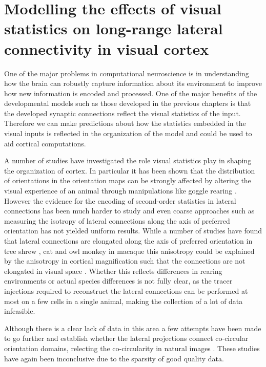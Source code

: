 \chapter{Modelling the effects of visual statistics on long-range lateral connectivity in visual cortex}

One of the major problems in computational neuroscience is in
understanding how the brain can robustly capture information about its
environment to improve how new information is encoded and
processed. One of the major benefits of the developmental models such
as those developed in the previous chapters is that the developed
synaptic connections reflect the visual statistics of the
input. Therefore we can make predictions about how the statistics
embedded in the visual inputs is reflected in the organization of the
model and could be used to aid cortical computations.

A number of studies have investigated the role visual statistics play
in shaping the organization of cortex. In particular it has been shown
that the distribution of orientations in the orientation maps can be
strongly affected by altering the visual experience of an animal
through manipulations like goggle rearing \cite{Tanaka2006}. However
the evidence for the encoding of second-order statistics in lateral
connections has been much harder to study and even coarse approaches
such as measuring the isotropy of lateral connections along the axis
of preferred orientation has not yielded uniform results. While a
number of studies have found that lateral connections are elongated
along the axis of preferred orientation in tree shrew
\citep{Bosking1997}, cat \citep{Schmidt1997} and owl monkey
\citep{Sincich2001} in macaque this anisotropy could be explained by
the anisotropy in cortical magnification such that the connections are
not elongated in visual space \citep{Angelucci2002}.  Whether this
reflects differences in rearing environments or actual species
differences is not fully clear, as the tracer injections required to
reconstruct the lateral connections can be performed at most on a few
cells in a single animal, making the collection of a lot of data
infeasible.

Although there is a clear lack of data in this area a few attempts
have been made to go further and establish whether the lateral
projections connect co-circular orientation domains, relecting the
co-circularity in natural images \citep{Hunt2011}. These studies have
again been inconclusive due to the sparsity of good quality data.

